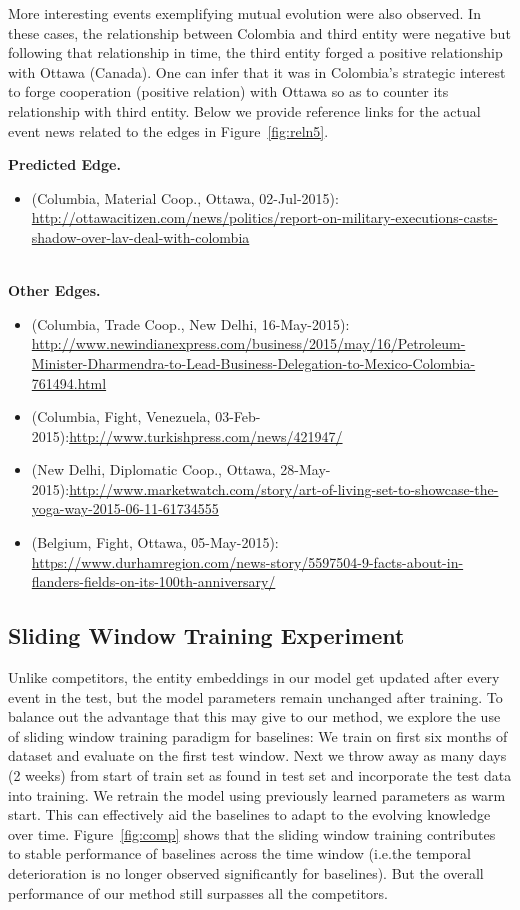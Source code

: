 \documentclass{article}
\begin{document}
More interesting events exemplifying mutual evolution were also observed. In these cases, the relationship between Colombia and third entity were negative but following that relationship in time, the third entity forged a positive relationship with Ottawa (Canada). One can infer that it was in Colombia's strategic interest to forge cooperation (positive relation) with Ottawa so as to counter its relationship with third entity. 
%
Below we provide reference links for the actual event news related to the edges in Figure~\ref{fig:reln5}.

{\bf Predicted Edge.}
\begin{itemize}
\item (Columbia, Material Coop., Ottawa, 02-Jul-2015): \url{http://ottawacitizen.com/news/politics/report-on-military-executions-casts-shadow-over-lav-deal-with-colombia}\\\\
\end{itemize}
{\bf Other Edges.}
\begin{itemize}
\item (Columbia, Trade Coop., New Delhi, 16-May-2015): \url{http://www.newindianexpress.com/business/2015/may/16/Petroleum-Minister-Dharmendra-to-Lead-Business-Delegation-to-Mexico-Colombia-761494.html}
\item (Columbia, Fight, Venezuela, 03-Feb-2015):\url{http://www.turkishpress.com/news/421947/}
\item (New Delhi, Diplomatic Coop., Ottawa, 28-May-2015):\url{http://www.marketwatch.com/story/art-of-living-set-to-showcase-the-yoga-way-2015-06-11-61734555}
\item (Belgium, Fight, Ottawa, 05-May-2015): \url{https://www.durhamregion.com/news-story/5597504-9-facts-about-in-flanders-fields-on-its-100th-anniversary/}
\end{itemize}

\setlength{\intextsep}{5pt}
\subsection{Sliding Window Training Experiment} 
Unlike competitors, the entity embeddings in our model get updated after every event in the test, but the model parameters remain unchanged after training. To balance out the advantage that this may give to our method, we explore the use of sliding window training paradigm for baselines: We train on first six months of dataset and evaluate on the first test window. Next we throw away as many days (2 weeks) from start of train set as found in test set and incorporate the test data into training. We retrain the model using previously
learned parameters as warm start. This can effectively aid the baselines to adapt to the evolving knowledge over time. Figure~\ref{fig:comp} shows that the sliding window training contributes to stable performance of baselines across the time window (i.e.the temporal deterioration is no longer observed significantly for baselines). But the overall performance of our method still surpasses all the competitors.
\end{document}
